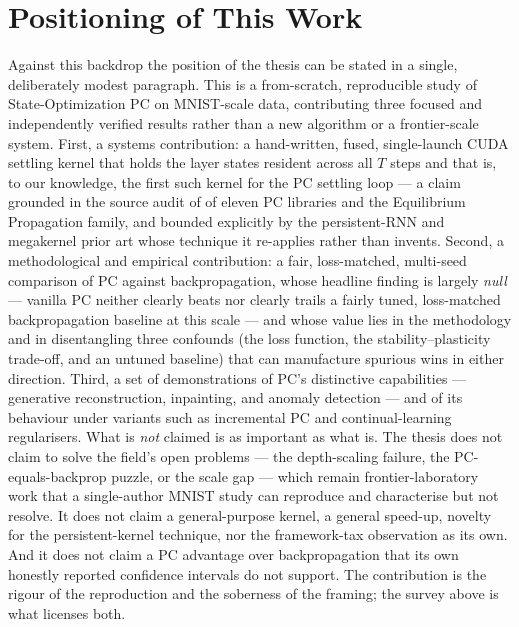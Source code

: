 \section{Positioning of This Work}

Against this backdrop the position of the thesis can be stated in a single, deliberately
modest paragraph. This is a from-scratch, reproducible study of State-Optimization PC on
MNIST-scale data, contributing three focused and independently verified results rather than
a new algorithm or a frontier-scale system. First, a systems contribution: a hand-written,
fused, single-launch CUDA settling kernel that holds the layer states resident across all
$T$ steps and that is, to our knowledge, the first such kernel for the PC settling loop ---
a claim grounded in the source audit of  of eleven PC libraries and the
Equilibrium Propagation family, and bounded explicitly by the persistent-RNN and megakernel
prior art whose technique it re-applies rather than invents. Second, a methodological and
empirical contribution: a fair, loss-matched, multi-seed comparison of PC against
backpropagation, whose headline finding is largely \emph{null} --- vanilla PC neither clearly
beats nor clearly trails a fairly tuned, loss-matched backpropagation baseline at this scale
--- and whose value lies in the methodology and in disentangling three confounds (the loss
function, the stability--plasticity trade-off, and an untuned baseline) that can manufacture
spurious wins in either direction. Third, a set of demonstrations of PC's distinctive
capabilities --- generative reconstruction, inpainting, and anomaly detection --- and of its
behaviour under variants such as incremental PC and continual-learning regularisers. What is
\emph{not} claimed is as important as what is. The thesis does not claim to solve the
field's open problems --- the depth-scaling failure, the PC-equals-backprop puzzle, or the
scale gap \citep{innocenti2026limits} --- which remain frontier-laboratory work that a
single-author MNIST study can reproduce and characterise but not resolve. It does not claim a
general-purpose kernel, a general speed-up, novelty for the persistent-kernel technique, nor
the framework-tax observation as its own. And it does not claim a PC advantage over
backpropagation that its own honestly reported confidence intervals do not support. The
contribution is the rigour of the reproduction and the soberness of the framing; the survey
above is what licenses both.

